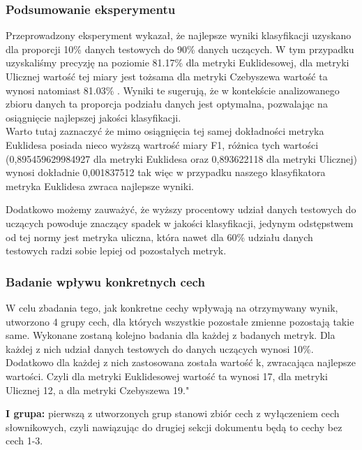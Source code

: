 \documentclass{article}
\begin{document}
\subsubsection*{Podsumowanie eksperymentu}

Przeprowadzony eksperyment wykazał, że najlepsze wyniki klasyfikacji uzyskano dla proporcji 10\% danych testowych do 90\% danych uczących. W tym przypadku uzyskaliśmy precyzję na poziomie 81.17\% dla metryki Euklidesowej, dla metryki Ulicznej wartość tej miary jest tożsama dla metryki Czebyszewa wartość ta wynosi natomiast 81.03\% . Wyniki te sugerują, że w kontekście analizowanego zbioru danych ta proporcja podziału danych jest optymalna, pozwalając na osiągnięcie najlepszej jakości klasyfikacji. \\

\noindent Warto tutaj zaznaczyć że mimo osiągnięcia tej samej dokładności metryka Euklidesa posiada nieco wyższą wartrość miary F1, różnica tych wartości (0,895459629984927 dla metryki Euklidesa oraz 0,893622118 dla metryki Ulicznej) wynosi dokładnie 0,001837512 tak więc w przypadku naszego klasyfikatora metryka Euklidesa zwraca najlepsze wyniki.

\noindent Dodatkowo możemy zauważyć, że wyższy procentowy udział danych testowych do uczących powoduje znaczący spadek w jakości klasyfikacji, jedynym odstępstwem od tej normy jest metryka uliczna, która nawet dla 60\% udziału danych testowych radzi sobie lepiej od pozostałych metryk. \\


\subsubsection*{Badanie wpływu konkretnych cech}

W celu zbadania tego, jak konkretne cechy wpływają na otrzymywany wynik, utworzono 4 grupy cech, dla których wszystkie pozostałe zmienne pozostają takie same. Wykonane zostaną kolejno badania dla każdej z badanych metryk. Dla każdej z nich udział danych testowych do danych uczących wynosi 10\%. Dodatkowo dla każdej z nich zastosowana została wartość k, zwracająca najlepsze wartości. Czyli dla metryki Euklidesowej wartość ta wynosi 17, dla metryki Ulicznej 12, a dla metryki Czebyszewa 19."

\noindent \textbf{I grupa: } pierwszą z utworzonych grup stanowi zbiór cech z wyłączeniem cech słownikowych, czyli nawiązując do drugiej sekcji dokumentu będą to cechy bez cech 1-3. \\
\end{document}
